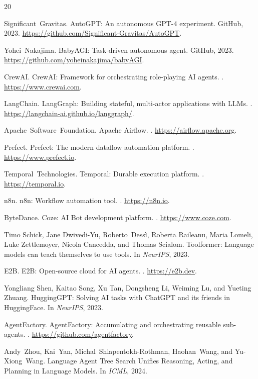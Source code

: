 \documentclass[11pt,a4paper]{article}
\begin{document}
\begin{thebibliography}{20}

Significant~Gravitas.
\newblock AutoGPT: An autonomous GPT-4 experiment.
\newblock GitHub, 2023.
\newblock \url{https://github.com/Significant-Gravitas/AutoGPT}.

Yohei~Nakajima.
\newblock BabyAGI: Task-driven autonomous agent.
\newblock GitHub, 2023.
\newblock \url{https://github.com/yoheinakajima/babyAGI}.

CrewAI.
\newblock CrewAI: Framework for orchestrating role-playing AI agents.
.
\newblock \url{https://www.crewai.com}.

LangChain.
\newblock LangGraph: Building stateful, multi-actor applications with LLMs.
.
\newblock \url{https://langchain-ai.github.io/langgraph/}.

Apache~Software~Foundation.
\newblock Apache Airflow.
.
\newblock \url{https://airflow.apache.org}.

Prefect.
\newblock Prefect: The modern dataflow automation platform.
.
\newblock \url{https://www.prefect.io}.

Temporal~Technologies.
\newblock Temporal: Durable execution platform.
.
\newblock \url{https://temporal.io}.

n8n.
\newblock n8n: Workflow automation tool.
.
\newblock \url{https://n8n.io}.

ByteDance.
\newblock Coze: AI Bot development platform.
.
\newblock \url{https://www.coze.com}.

Timo Schick, Jane Dwivedi-Yu, Roberto~Dess\`{i}, Roberta Raileanu, Maria Lomeli, Luke Zettlemoyer, Nicola Cancedda, and Thomas Scialom.
\newblock Toolformer: Language models can teach themselves to use tools.
\newblock In \emph{NeurIPS}, 2023.

E2B.
\newblock E2B: Open-source cloud for AI agents.
.
\newblock \url{https://e2b.dev}.

Yongliang Shen, Kaitao Song, Xu Tan, Dongsheng Li, Weiming Lu, and Yueting Zhuang.
\newblock HuggingGPT: Solving AI tasks with ChatGPT and its friends in HuggingFace.
\newblock In \emph{NeurIPS}, 2023.

AgentFactory.
\newblock AgentFactory: Accumulating and orchestrating reusable sub-agents.
.
\newblock \url{https://github.com/agentfactory}.

Andy~Zhou, Kai~Yan, Michal~Shlapentokh-Rothman, Haohan~Wang, and Yu-Xiong~Wang.
\newblock Language Agent Tree Search Unifies Reasoning, Acting, and Planning in Language Models.
\newblock In \emph{ICML}, 2024.

\end{thebibliography}
\end{document}
